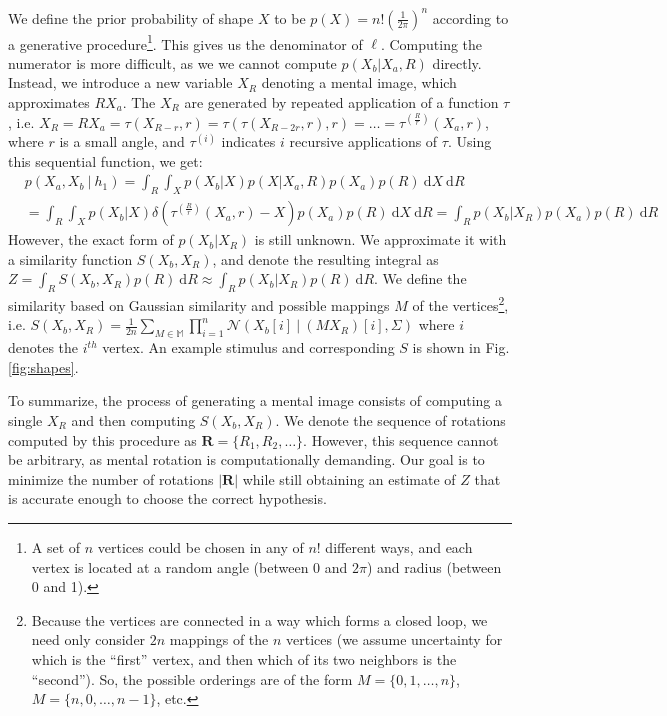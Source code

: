 \documentclass{article} %
\begin{document}
We define the prior probability of shape $X$ to be
$p(X)=n!\left(\frac{1}{2\pi}\right)^n$ according to a generative
procedure\footnote{A set of $n$ vertices could be chosen in any of
  $n!$ different ways, and each vertex is located at a random angle
  (between 0 and $2\pi$) and radius (between 0 and 1).}. This gives us
the denominator of $\ell$. Computing the numerator is more difficult,
as we we cannot compute $p(X_b\vert X_a, R)$ directly. Instead, we
introduce a new variable $X_R$ denoting a mental image, which
approximates $RX_a$. The $X_R$ are generated by repeated application
of a function $\tau$, i.e. $X_R=RX_a=\tau(X_{R-r},
r)=\tau(\tau(X_{R-2r}, r), r)=\ldots{}=\tau^{(\frac{R}{r})}(X_a, r)$,
where $r$ is a small angle, and $\tau^{(i)}$ indicates $i$ recursive
applications of $\tau$. Using this sequential function, we get:
\begin{align}
  &p(X_a, X_b\ \vert \ h_1)=\int_R \int_{X} p(X_b\vert X) p(X\vert X_a, R)p(X_a)p(R)\ \mathrm{d}X\ \mathrm{d}R \nonumber \\
  &= \int_R \int_X p(X_b\vert X)\delta(\tau^{(\frac{R}{r})}(X_a, r)-X)p(X_a)p(R)\ \mathrm{d}X\ \mathrm{d}R = \int_R p(X_b\vert X_R)p(X_a)p(R)\ \mathrm{d}R
\end{align}
However, the exact form of $p(X_b\vert X_R)$ is still unknown. We
approximate it with a similarity function $S(X_b, X_R)$, and denote
the resulting integral as $Z=\int_R S(X_b, X_R)p(R)\
\mathrm{d}R\approx \int_R p(X_b\vert X_R)p(R)\ \mathrm{d}R$.  We
define the similarity based on Gaussian similarity and possible
mappings $M$ of the vertices\footnote{Because the vertices are
  connected in a way which forms a closed loop, we need only consider
  $2n$ mappings of the $n$ vertices (we assume uncertainty for which
  is the ``first'' vertex, and then which of its two neighbors is the
  ``second''). So, the possible orderings are of the form
  $M=\lbrace{}0, 1, \ldots{}, n\rbrace{}$, $M=\lbrace{}n, 0, \ldots{},
  n-1\rbrace{}$, etc.}, i.e. $S(X_b,
X_R)=\frac{1}{2n}\sum_{M\in\mathbb{M}}\prod_{i=1}^n\mathcal{N}(X_b[i]\
\vert \ (MX_R)[i], \Sigma)$ where $i$ denotes the $i^{th}$ vertex. An
example stimulus and corresponding $S$ is shown in Fig.
\ref{fig:shapes}.

To summarize, the process of generating a mental image consists of
computing a single $X_R$ and then computing $S(X_b, X_R)$. We denote
the sequence of rotations computed by this procedure as
$\mathbf{R}=\{R_1, R_2, \ldots{}\}$. However, this sequence cannot be
arbitrary, as mental rotation is computationally demanding. Our goal
is to minimize the number of rotations $\vert\mathbf{R}\vert$ while
still obtaining an estimate of $Z$ that is accurate enough to choose
the correct hypothesis.
\end{document}
